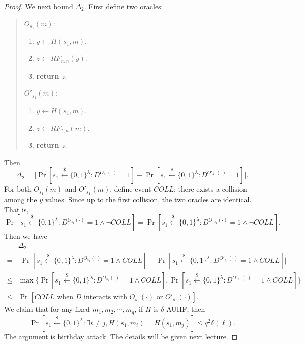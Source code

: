 \documentclass[12pt]{article}
\newcommand{\bits}{\{0,1\}}
\newcommand{\getsr}{\stackrel{\$}{\gets}}
\theoremstyle{definition}
\begin{document}
\begin{proof}
We next bound $\Delta_2$. First define two oracles:
\begin{quote}
\begin{minipage}{.3\textwidth}
$O_{s_1}(m)$:
\begin{enumerate}
\item $y \gets H(s_1, m)$.
\item $z \gets RF_{n,n}(y)$.
\item {\bf return} $z$.
\end{enumerate}
\end{minipage}
\begin{minipage}{.3\textwidth}
$O'_{s_1}(m)$:
\begin{enumerate}
\item $y \gets H(s_1, m)$.
\item $z \gets RF_{*,n}(m)$.
\item {\bf return} $z$.
\end{enumerate}
\end{minipage}
\end{quote}
Then 
$$\Delta_2 = \bigg| \Pr[s_1 \getsr \bits^\lambda : D^{O_{s_1}(\cdot)}=1] - \Pr[s_1 \getsr \bits^\lambda : D^{O'_{s_1}(\cdot)}=1] \bigg|.$$
For both $O_{s_1}(m)$ and $O'_{s_1}(m)$, define event $COLL$: there exists a collision among the $y$ values.
Since up to the first collision, the two oracles are identical. That is,
$$\Pr[s_1 \getsr \bits^\lambda : D^{O_{s_1}(\cdot)}=1 \wedge \neg COLL] = \Pr[s_1 \getsr \bits^\lambda : D^{O'_{s_1}(\cdot)}=1 \wedge \neg COLL].$$
Then we have 
$$\begin{aligned}
& \Delta_2 \\
 =& \bigg| \Pr[s_1 \getsr \bits^\lambda : D^{O_{s_1}(\cdot)}=1 \wedge COLL] - \Pr[s_1 \getsr \bits^\lambda : D^{O'_{s_1}(\cdot)}=1 \wedge COLL] \bigg| \\
\leq& \max\{\Pr[s_1 \getsr \bits^\lambda : D^{O_{s_1}(\cdot)}=1 \wedge COLL], \Pr[s_1 \getsr \bits^\lambda : D^{O'_{s_1}(\cdot)}=1 \wedge COLL]\} \\
\leq& \Pr[COLL \textrm{ when $D$ interacts with $O_{s_1}(\cdot)$ or $O'_{s_1}(\cdot)$}].
\end{aligned}$$
We claim that for any fixed $m_1,m_2,\cdots,m_q$, if $H$ is $\delta$-AUHF, then 
$$\Pr[s_1 \getsr \bits^\lambda : \exists i \not= j, H(s_1,m_i) = H(s_1,m_j)] \leq q^2\delta(\ell).$$
The argument is birthday attack. 
The details will be given next lecture.
\end{proof}
\end{document}
